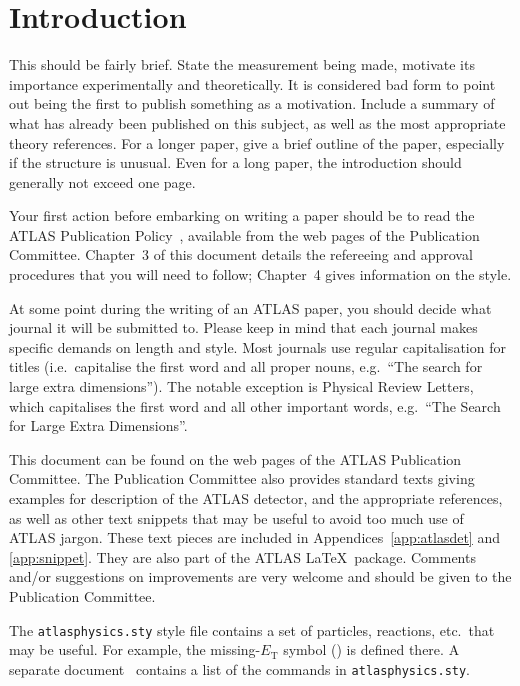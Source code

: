 \documentclass[PAPER,UKenglish]{latex/atlasdoc}
\begin{document}
\section{Introduction}
\label{sec:intro}

This should be fairly brief. 
State the measurement being made, motivate its importance experimentally and theoretically.
It is considered bad form to point out being the first to publish something as a motivation.
Include a summary of what has already been published on this subject,
as well as the most appropriate theory references.
For a longer paper, give a brief outline of the paper, especially if the structure is unusual.
Even for a long paper, the introduction should generally not exceed one page.

Your first action before embarking on writing a paper should be to
read the ATLAS Publication Policy~\cite{publication-policy}, available
from the web pages of the Publication Committee. Chapter~3 of this
document details the refereeing and approval procedures that you will
need to follow; Chapter~4 gives information on the style.

At some point during the writing of an ATLAS paper, you should decide what journal it will be submitted to.
Please keep in mind that each journal makes specific demands on length and style.
Most journals use regular capitalisation for titles 
(i.e.\ capitalise the first word and all proper nouns, 
e.g.\ \enquote{The search for large extra dimensions}). 
The notable exception is Physical Review Letters, which capitalises the
first word and all other important words,
e.g.\ \enquote{The Search for Large Extra Dimensions}.

This document can be found on the web pages of the ATLAS Publication Committee. 
The Publication Committee also provides standard texts giving examples
for description of the ATLAS detector, and the appropriate references,
as well as other text snippets that may be useful to avoid too much use of ATLAS jargon.
These text pieces are included in Appendices~\ref{app:atlasdet} and \ref{app:snippet}.
They are also part of the ATLAS \LaTeX\ package.
Comments and/or suggestions on improvements are very welcome and
should be given to the Publication Committee.

The \texttt{atlasphysics.sty} style file contains a set of particles,
reactions, etc.\ that may be useful. For example, the missing-$E_{\text{T}}$
symbol (\met{}) is defined there. 
A separate document~\cite{atlas-physics}
contains a list of the commands in \texttt{atlasphysics.sty}.
\end{document}
